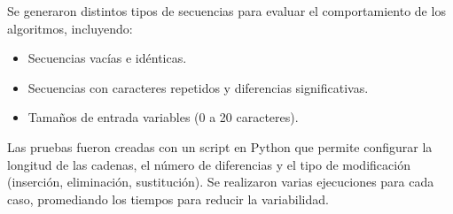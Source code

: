 Se generaron distintos tipos de secuencias para evaluar el comportamiento de los algoritmos, incluyendo:
\begin{itemize}
    \item Secuencias vacías e idénticas.
    \item Secuencias con caracteres repetidos y diferencias significativas.
    \item Tamaños de entrada variables (0 a 20 caracteres).
\end{itemize}

Las pruebas fueron creadas con un script en Python que permite configurar la longitud de las cadenas, el número de diferencias y el tipo de modificación (inserción, eliminación, sustitución). Se realizaron varias ejecuciones para cada caso, promediando los tiempos para reducir la variabilidad.
